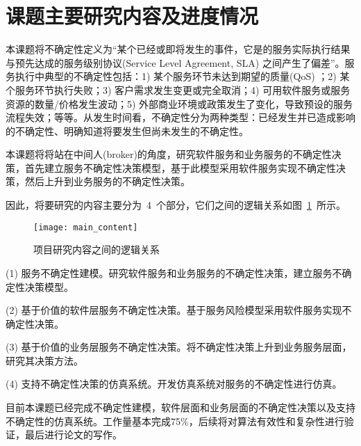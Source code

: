 \section{课题主要研究内容及进度情况}

本课题将不确定性定义为“某个已经或即将发生的事件，它是的服务实际执行结果与预先达成的服务级别协议(Service Level Agreement, SLA) 之间产生了偏差”。服务执行中典型的不确定性包括：1) 某个服务环节未达到期望的质量(QoS) ；2) 某个服务环节执行失败；3) 客户需求发生变更或完全取消；4) 可用软件服务或服务资源的数量/价格发生波动；5) 外部商业环境或政策发生了变化，导致预设的服务流程失效；等等。从发生时间看，不确定性分为两种类型：已经发生并已造成影响的不确定性、明确知道将要发生但尚未发生的不确定性。

本课题将将站在中间人(broker)的角度，研究软件服务和业务服务的不确定性决策，首先建立服务不确定性决策模型，基于此模型采用软件服务实现不确定性决策，然后上升到业务服务的不确定性决策。

因此，将要研究的内容主要分为~4~个部分，它们之间的逻辑关系如图~\ref{main_content}~所示。

\begin{figure}[htbp]
    \centering
    \texttt{[image: main\_content]}
    \caption{项目研究内容之间的逻辑关系}\label{main_content}
    \vspace{-1em}
\end{figure}

\setcounter{paragraph}{0}

(1) 服务不确定性建模。研究软件服务和业务服务的不确定性决策，建立服务不确定性决策模型。

(2) 基于价值的软件层服务不确定性决策。基于服务风险模型采用软件服务实现不确定性决策。

(3) 基于价值的业务层服务不确定性决策。将不确定性决策上升到业务服务层面，研究其决策方法。

(4) 支持不确定性决策的仿真系统。开发仿真系统对服务的不确定性进行仿真。

目前本课题已经完成不确定性建模，软件层面和业务层面的不确定性决策以及支持不确定性的仿真系统。工作量基本完成75\%，后续将对算法有效性和复杂性进行验证，最后进行论文的写作。


